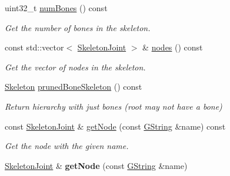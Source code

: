 \begin{Indent}
\begin{DoxyCompactItemize}
\mbox{\label{classrev_1_1_skeleton_a8187661a458f7d5c6534a1b7d7aa34bd}} 
uint32\+\_\+t \mbox{\hyperlink{classrev_1_1_skeleton_a8187661a458f7d5c6534a1b7d7aa34bd}{num\+Bones}} () const
\begin{DoxyCompactList}\small\item\em Get the number of bones in the skeleton. \end{DoxyCompactList}\item 
\mbox{\label{classrev_1_1_skeleton_a89c844c01f3200f42fa812d691af3cb5}} 
const std\+::vector$<$ \mbox{\hyperlink{classrev_1_1_skeleton_joint}{Skeleton\+Joint}} $>$ \& \mbox{\hyperlink{classrev_1_1_skeleton_a89c844c01f3200f42fa812d691af3cb5}{nodes}} () const
\begin{DoxyCompactList}\small\item\em Get the vector of nodes in the skeleton. \end{DoxyCompactList}\item 
\mbox{\label{classrev_1_1_skeleton_a9b121e7a33dbef031c75e1b9098302dc}} 
\mbox{\hyperlink{classrev_1_1_skeleton}{Skeleton}} \mbox{\hyperlink{classrev_1_1_skeleton_a9b121e7a33dbef031c75e1b9098302dc}{pruned\+Bone\+Skeleton}} () const
\begin{DoxyCompactList}\small\item\em Return hierarchy with just bones (root may not have a bone) \end{DoxyCompactList}\item 
\mbox{\label{classrev_1_1_skeleton_af80a524f62a0f16323b946c7bfb3cecc}} 
const \mbox{\hyperlink{classrev_1_1_skeleton_joint}{Skeleton\+Joint}} \& \mbox{\hyperlink{classrev_1_1_skeleton_af80a524f62a0f16323b946c7bfb3cecc}{get\+Node}} (const \mbox{\hyperlink{classrev_1_1_g_string}{G\+String}} \&name) const
\begin{DoxyCompactList}\small\item\em Get the node with the given name. \end{DoxyCompactList}\item 
\mbox{\label{classrev_1_1_skeleton_aa712c7b484dfff57439020d88cf5dbb6}} 
\mbox{\hyperlink{classrev_1_1_skeleton_joint}{Skeleton\+Joint}} \& {\bfseries get\+Node} (const \mbox{\hyperlink{classrev_1_1_g_string}{G\+String}} \&name)

\end{DoxyCompactItemize}
\end{Indent}
